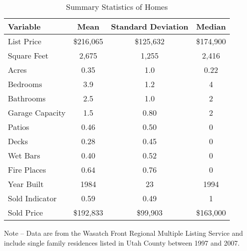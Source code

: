 \documentclass[AEJ,draftmode]{AEA}
\begin{document}
\begin{table}[ht]
    \begin{center}
    \caption{Summary Statistics of Homes}
    \begin{tabular}{@{}lccc@{}} \toprule
        Variable        & Mean      & Standard Deviation    & Median \\ \midrule
        List Price      & \$216,065 & \$125,632             & \$174,900 \\
        Square Feet     & 2,675     & 1,255                 & 2,416 \\
        Acres           & 0.35      & 1.0                   & 0.22 \\
        Bedrooms        & 3.9       & 1.2                   & 4 \\
        Bathrooms       & 2.5       & 1.0                   & 2 \\
        Garage Capacity & 1.5       & 0.80                  & 2 \\
        Patios          & 0.46      & 0.50                  & 0 \\
        Decks           & 0.28      & 0.45                  & 0 \\
        Wet Bars        & 0.40      & 0.52                  & 0 \\
        Fire Places     & 0.64      & 0.76                  & 0 \\
        Year Built      & 1984      & 23                    & 1994 \\
        Sold Indicator  & 0.59      & 0.49                  & 1 \\
        Sold Price      & \$192,833 & \$99,903              & \$163,000 \\ \bottomrule
    \end{tabular}
    \begin{minipage}{.88\hsize}
    {\footnotesize Note -- Data are from the Wasatch Front Regional Multiple Listing Service and include single family residences listed in Utah County between 1997 and 2007.}
    \end{minipage}
    \end{center}
\end{table}
\end{document}

